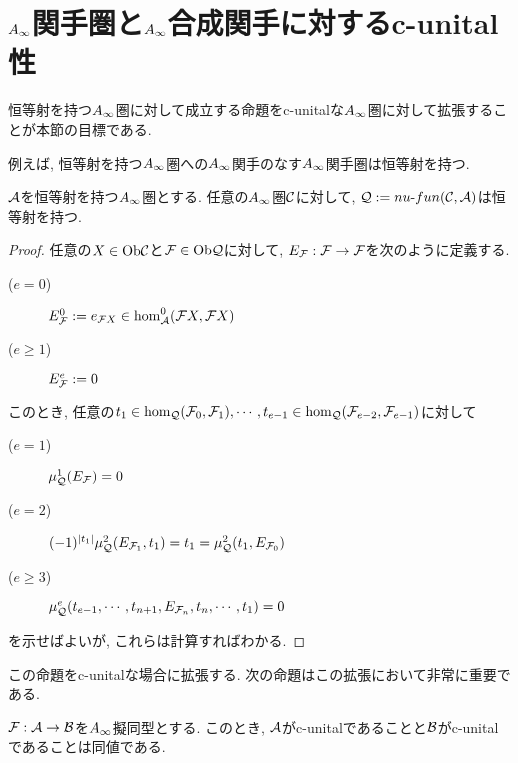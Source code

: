 \documentclass[uplatex, a4paper, 14Q, dvipdfmx]{jsarticle}
\begin{document}

\section{\texorpdfstring{$A_{\infty}$}{Ainf}関手圏と\texorpdfstring{$A_{\infty}$}{Ainf}合成関手に対するc-unital性}

恒等射を持つ$A_{\infty}$圏に対して成立する命題をc-unitalな$A_{\infty}$圏に対して拡張することが本節の目標である. 

例えば, 恒等射を持つ$A_{\infty}$圏への$A_{\infty}$関手のなす$A_{\infty}$関手圏は恒等射を持つ. 

\begin{lemma} \label{prop_nufun_is_also_unital}
  $\mathcal{A}$を恒等射を持つ$A_{\infty}$圏とする. 
  任意の$A_{\infty}$圏$\mathcal{C}$に対して, $\mathcal{Q} := nu \text{-} fun (\mathcal{C}, \mathcal{A})$は恒等射を持つ. 
\end{lemma}

\begin{proof}
  任意の$X \in \mathrm{Ob}\mathcal{C}$と$\mathcal{F} \in \mathrm{Ob}\mathcal{Q}$に対して, $E_{\mathcal{F}} : \mathcal{F} \to \mathcal{F}$を次のように定義する.
  \begin{description}
    \item[($e=0$)] $E_{\mathcal{F}}^0 := e_{\mathcal{F} X} \in \hom_{\mathcal{A}}^0(\mathcal{F} X,\mathcal{F} X)$
    \item[($e \geq 1$)] $E_{\mathcal{F}}^e := 0$
  \end{description}
  このとき, 任意の$t_1 \in \hom_{\mathcal{Q}}(\mathcal{F}_0,\mathcal{F}_1),\cdots,t_{e-1} \in \hom_{\mathcal{Q}}(\mathcal{F}_{e-2},\mathcal{F}_{e-1})$に対して
  \begin{description}
    \item[($e=1$)] $\mu^1_{\mathcal{Q}}(E_{\mathcal{F}}) = 0$ 
    \item[($e=2$)] $(-1)^{|t_1|} \mu^2_{\mathcal{Q}}(E_{\mathcal{F}_1},t_1) = t_1 = \mu^2_{\mathcal{Q}}(t_1,E_{\mathcal{F}_0})$
    \item[($e \geq 3$)] $\mu^e_{\mathcal{Q}}(t_{e-1},\cdots,t_{n+1},E_{\mathcal{F}_n},t_n,\cdots,t_1) = 0$
  \end{description}
  を示せばよいが, これらは計算すればわかる. 
\end{proof}

この命題をc-unitalな場合に拡張する.
次の命題はこの拡張において非常に重要である.

\begin{lemma} \label{prop_one_is_c_unital_induces_another}
  $\mathcal{F} : \mathcal{A} \to \mathcal{B}$を$A_{\infty}$擬同型とする. 
  このとき, $\mathcal{A}$がc-unitalであることと$\mathcal{B}$がc-unitalであることは同値である.
\end{lemma}
\end{document}
